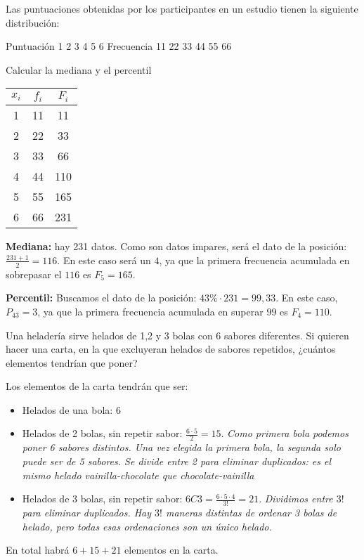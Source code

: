\documentclass[palatino,nosec,nochap]{Docencia}
\begin{document}
\begin{problem}
Las puntuaciones obtenidas por los participantes en un estudio tienen la siguiente distribución:

Puntuación	1	2	3	4	5	6
Frecuencia	11	22	33	44	55	66

Calcular la mediana y el percentil

\solution

\begin{tabular}{ccc}
$x_i$ & $f_i$ & $F_i$\\\hline
1 & 11 & 11\\
2 & 22 & 33\\
3 & 33 & 66\\
4 & 44 & 110\\
5 & 55 & 165\\
6 & 66 & 231
\end{tabular}

\textbf{Mediana: } hay 231 datos. Como son datos impares, será el dato de la posición: $\frac{231+1}{2} = 116$. En este caso será un $4$, ya que la primera frecuencia acumulada en sobrepasar el $116$ es $F_5 = 165$.

\textbf{Percentil: } Buscamos el dato de la posición: $43\%·231 = 99,33$. En este caso, $P_{43} = 3$, ya que la primera frecuencia acumulada en superar $99$ es $F_4 = 110$.

\end{problem}

\begin{problem}
Una heladería sirve helados de 1,2 y 3 bolas con 6 sabores diferentes. Si quieren hacer una carta, en la que excluyeran helados de sabores repetidos, ¿cuántos elementos tendrían que poner?

\solution

Los elementos de la carta tendrán que ser:

\begin{itemize}
	\item Helados de una bola: $6$
	\item Helados de 2 bolas, sin repetir sabor: $\frac{6·5}{2} = 15$. \textit{Como primera bola podemos poner 6 sabores distintos. Una vez elegida la primera bola, la segunda solo puede ser de 5 sabores. Se divide entre 2 para eliminar duplicados: es el mismo helado vainilla-chocolate que chocolate-vainilla}
	\item Helados de 3 bolas, sin repetir sabor: $6C3 = \frac{6·5·4}{3!} = 21$. \textit{Dividimos entre $3!$ para eliminar duplicados. Hay $3!$ maneras distintas de ordenar 3 bolas de helado, pero todas esas ordenaciones son un único helado.}
\end{itemize}

En total habrá $6+15+21$ elementos en la carta.

\end{problem}
\end{document}

